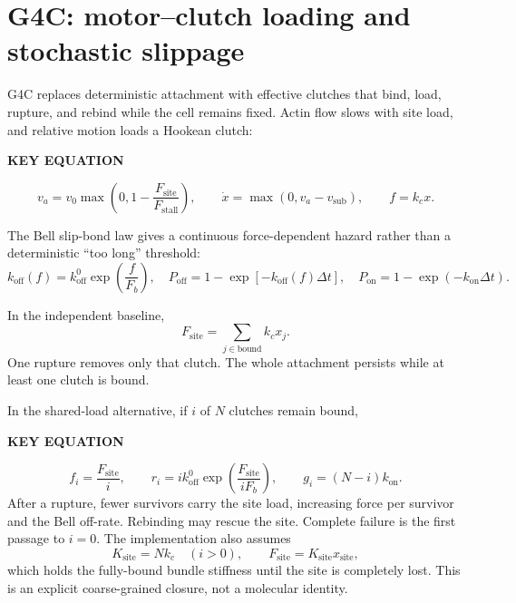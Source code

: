 \documentclass[10.5pt]{article}
\newcommand{\keylabel}{\par\smallskip\noindent\textcolor{g4}{\textbf{KEY EQUATION}}\par\vspace{-5pt}}
\begin{document}
\section{G4C: motor--clutch loading and stochastic slippage}

G4C replaces deterministic attachment with effective clutches that bind, load, rupture, and
rebind while the cell remains fixed. Actin flow slows with site load, and relative motion loads a
Hookean clutch:
\keylabel
\begin{equation}
 v_a=v_0\max\!\left(0,1-\frac{F_{\mathrm{site}}}{F_{\mathrm{stall}}}\right),
 \qquad
 \dot x=\max(0,v_a-v_{\mathrm{sub}}),
 \qquad f=k_cx.
 \label{eq:motor}
\end{equation}

The Bell slip-bond law gives a continuous force-dependent hazard rather than a deterministic
``too long'' threshold:
\begin{equation}
 k_{\mathrm{off}}(f)=k_{\mathrm{off}}^0\exp\!\left(\frac{f}{F_b}\right),
 \quad
 P_{\mathrm{off}}=1-\exp[-k_{\mathrm{off}}(f)\Delta t],
 \quad
 P_{\mathrm{on}}=1-\exp(-k_{\mathrm{on}}\Delta t).
 \label{eq:bell}
\end{equation}

In the independent baseline,
\begin{equation}
 F_{\mathrm{site}}=\sum_{j\in\mathrm{bound}}k_cx_j.
 \label{eq:independent}
\end{equation}
One rupture removes only that clutch. The whole attachment persists while at least one clutch is
bound.

In the shared-load alternative, if $i$ of $N$ clutches remain bound,
\keylabel
\begin{equation}
 f_i=\frac{F_{\mathrm{site}}}{i},\qquad
 r_i=i k_{\mathrm{off}}^0
 \exp\!\left(\frac{F_{\mathrm{site}}}{iF_b}\right),\qquad
 g_i=(N-i)k_{\mathrm{on}}.
 \label{eq:shared}
\end{equation}
After a rupture, fewer survivors carry the site load, increasing force per survivor and the Bell
off-rate. Rebinding may rescue the site. Complete failure is the first passage to $i=0$.
The implementation also assumes
\begin{equation}
 K_{\mathrm{site}}=Nk_c\quad(i>0),\qquad
 F_{\mathrm{site}}=K_{\mathrm{site}}x_{\mathrm{site}},
 \label{eq:bundle}
\end{equation}
which holds the fully-bound bundle stiffness until the site is completely lost. This is an
explicit coarse-grained closure, not a molecular identity.
\end{document}
